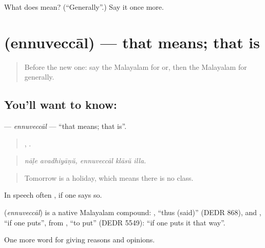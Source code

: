 \begin{tcolorbox}[breakable,colback=teal!4,colframe=teal!35!black,title={Before you move on}]
What does  mean? (\textquotedblleft{}Generally\textquotedblright{}.) Say it once more.
\end{tcolorbox}
\section[\texorpdfstring{\ml{എന്നുവെച്ചാൽ} (ennuveccāl)}{എന്നുവെച്ചാൽ (ennuveccāl)}]{ (ennuveccāl) — that means; that is}

\label{lesson:ML-C412-ennuveccal}



\begin{quote}
Before the new one: say the Malayalam for or, then the Malayalam for generally.
\end{quote}

\subsection*{You'll want to know: }
\textbf{} — \emph{ennuveccāl} — \textquotedblleft{}that means; that is\textquotedblright{}.

\begin{quote}
 ,   .
\end{quote}

\begin{quote}
\emph{nāḷe avadhiyāṇŭ, ennuveccāl klāsŭ illa.}
\end{quote}

\begin{quote}
Tomorrow is a holiday, which means there is no class.
\end{quote}

In speech often  , if one says so.

\begin{cousinweb}
\textbf{} (\emph{ennuveccāl}) is a native Malayalam compound: , \textquotedblleft{}thus (said)\textquotedblright{} (DEDR 868), and , \textquotedblleft{}if one puts\textquotedblright{}, from , \textquotedblleft{}to put\textquotedblright{} (DEDR 5549): \textquotedblleft{}if one puts it that way\textquotedblright{}.
\end{cousinweb}

\begin{grammarlens}[title={What you've built}]
One more word for giving reasons and opinions.
\end{grammarlens}

